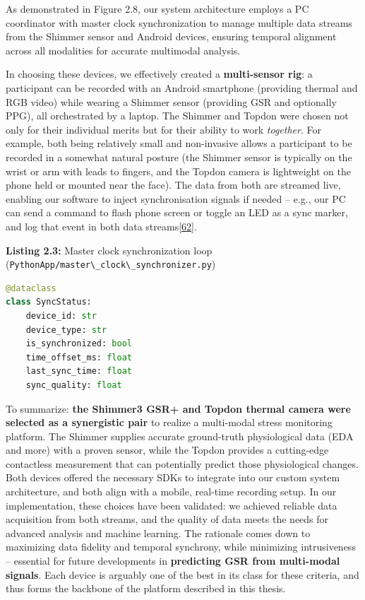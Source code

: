 \documentclass[12pt,a4paper]{article}
\begin{document}
As demonstrated in Figure 2.8, our system architecture employs a PC coordinator with master clock synchronization to manage multiple data streams from the Shimmer sensor and Android devices, ensuring temporal alignment across all modalities for accurate multimodal analysis.

In choosing these devices, we effectively created a \textbf{multi-sensor rig}: a participant can be recorded with an Android smartphone (providing thermal and RGB video) while wearing a Shimmer sensor (providing GSR and optionally PPG), all orchestrated by a laptop. The Shimmer and Topdon were chosen not only for their individual merits but for their ability to work \emph{together}. For example, both being relatively small and non-invasive allows a participant to be recorded in a somewhat natural posture (the Shimmer sensor is typically on the wrist or arm with leads to fingers, and the Topdon camera is lightweight on the phone held or mounted near the face). The data from both are streamed live, enabling our software to inject synchronisation signals if needed -- e.g., our PC can send a command to flash phone screen or toggle an LED as a sync marker, and log that event in both data streams\href{https://github.com/buccancs/bucika_gsr/blob/7048f7f6a7536f5cd577ed2184800d3dad97fd08/PythonApp/shimmer_pc_app.py\#L170-L178}{{[}62{]}}.

\textbf{Listing 2.3:} Master clock synchronization loop (\passthrough{\lstinline!PythonApp/master\_clock\_synchronizer.py!})

\begin{lstlisting}[language=Python]
@dataclass
class SyncStatus:
    device_id: str
    device_type: str
    is_synchronized: bool
    time_offset_ms: float
    last_sync_time: float
    sync_quality: float
\end{lstlisting}

To summarize: \textbf{the Shimmer3 GSR+ and Topdon thermal camera were selected as a synergistic pair} to realize a multi-modal stress monitoring platform. The Shimmer supplies accurate ground-truth physiological data (EDA and more) with a proven sensor, while the Topdon provides a cutting-edge contactless measurement that can potentially predict those physiological changes. Both devices offered the necessary SDKs to integrate into our custom system architecture, and both align with a mobile, real-time recording setup. In our implementation, these choices have been validated: we achieved reliable data acquisition from both streams, and the quality of data meets the needs for advanced analysis and machine learning. The rationale comes down to maximizing data fidelity and temporal synchrony, while minimizing intrusiveness -- essential for future developments in \textbf{predicting GSR from multi-modal signals}. Each device is arguably one of the best in its class for these criteria, and thus forms the backbone of the platform described in this thesis.
\end{document}
